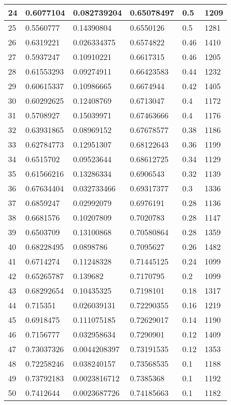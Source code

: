 \begin{longtable}{|l|l|l|l|l|l|}
24 & 0.6077104 & 0.082739204 & 0.65078497 & 0.5 & 1209 \\ \hline 
25 & 0.5560777 & 0.14390804 & 0.6550126 & 0.5 & 1281 \\ \hline 
26 & 0.6319221 & 0.026334375 & 0.6574822 & 0.46 & 1410 \\ \hline 
27 & 0.5937247 & 0.10910221 & 0.6617315 & 0.46 & 1205 \\ \hline 
28 & 0.61553293 & 0.09274911 & 0.66423583 & 0.44 & 1232 \\ \hline 
29 & 0.60615337 & 0.10986665 & 0.6674944 & 0.42 & 1405 \\ \hline 
30 & 0.60292625 & 0.12408769 & 0.6713047 & 0.4 & 1172 \\ \hline 
31 & 0.5708927 & 0.15039971 & 0.67463666 & 0.4 & 1176 \\ \hline 
32 & 0.63931865 & 0.08969152 & 0.67678577 & 0.38 & 1186 \\ \hline 
33 & 0.62784773 & 0.12951307 & 0.68122643 & 0.36 & 1199 \\ \hline 
34 & 0.6515702 & 0.09523644 & 0.68612725 & 0.34 & 1129 \\ \hline 
35 & 0.61566216 & 0.13286334 & 0.6906543 & 0.32 & 1139 \\ \hline 
36 & 0.67634404 & 0.032733466 & 0.69317377 & 0.3 & 1336 \\ \hline 
37 & 0.6859247 & 0.02992079 & 0.6976191 & 0.28 & 1136 \\ \hline 
38 & 0.6681576 & 0.10207809 & 0.7020783 & 0.28 & 1147 \\ \hline 
39 & 0.6503709 & 0.13100868 & 0.70580864 & 0.28 & 1359 \\ \hline 
40 & 0.68228495 & 0.0898786 & 0.7095627 & 0.26 & 1482 \\ \hline 
41 & 0.6714274 & 0.11248328 & 0.71445125 & 0.24 & 1099 \\ \hline 
42 & 0.65265787 & 0.139682 & 0.7170795 & 0.2 & 1099 \\ \hline 
43 & 0.68292654 & 0.10435325 & 0.7198101 & 0.18 & 1317 \\ \hline 
44 & 0.715351 & 0.026039131 & 0.72290355 & 0.16 & 1219 \\ \hline 
45 & 0.6918475 & 0.111075185 & 0.72629017 & 0.14 & 1190 \\ \hline 
46 & 0.7156777 & 0.032958634 & 0.7290901 & 0.12 & 1409 \\ \hline 
47 & 0.73037326 & 0.0044208397 & 0.73191535 & 0.12 & 1353 \\ \hline 
48 & 0.72258246 & 0.038240157 & 0.73568535 & 0.1 & 1188 \\ \hline 
49 & 0.73792183 & 0.0023816712 & 0.7385368 & 0.1 & 1192 \\ \hline 
50 & 0.7412644 & 0.0023687726 & 0.74185663 & 0.1 & 1182 \\ \hline 
\end{longtable}